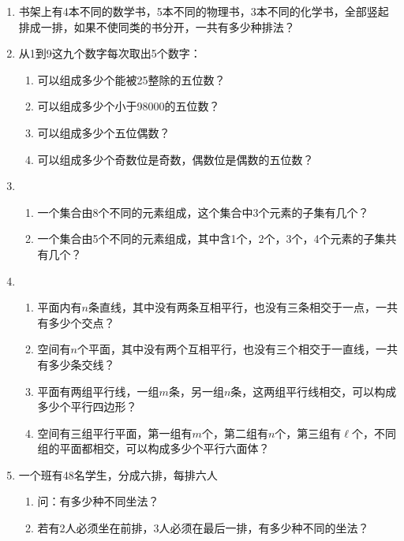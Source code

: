 \begin{enumerate}
\item 书架上有4本不同的数学书，5本不同的物理书，3本不同的化学书，全部竖起排成一排，如果不使同类的书分开，一共有多少种排法？
\item 从1到9这九个数字每次取出5个数字：
\begin{enumerate}[(1)]
\item 可以组成多少个能被25整除的五位数？
\item 可以组成多少个小于98000的五位数？
\item 可以组成多少个五位偶数？
\item 可以组成多少个奇数位是奇数，偶数位是偶数的五位数？   
\end{enumerate}

\item \begin{enumerate}[(1)]
    \item 一个集合由8个不同的元素组成，这个集合中3个元素的子集有几个？
    \item 一个集合由5个不同的元素组成，其中含1个，2个，3个，4个元素的子集共有几个？
\end{enumerate}

\item \begin{enumerate}[(1)]
\item 平面内有$n$条直线，其中没有两条互相平行，也没有三条相交于一点，一共有多少个交点？
\item 空间有$n$个平面，其中没有两个互相平行，也没有三个相交于一直线，一共有多少条交线？
\item 平面有两组平行线，一组$m$条，另一组$n$条，这两组平行线相交，可以构成多少个平行四边形？
\item 空间有三组平行平面，第一组有$m$个，第二组有$n$个，第三组有$\ell$个，不同组的平面都相交，可以构成多少个平行六面体？
\end{enumerate}

\item 一个班有48名学生，分成六排，每排六人
\begin{enumerate}[(1)]
\item 问：有多少种不同坐法？
\item 若有2人必须坐在前排，3人必须在最后一排，有多少种不同的坐法？
\end{enumerate}


\end{enumerate}
